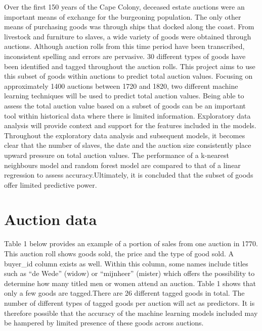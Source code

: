 \documentclass[11pt,preprint, authoryear]{elsarticle}
\numberwithin{equation}{section}
\numberwithin{figure}{section}
\numberwithin{table}{section}
\begin{document}
Over the first 150 years of the Cape Colony, deceased estate auctions
were an important means of exchange for the burgeoning population. The
only other means of purchasing goods was through ships that docked along
the coast. From livestock and furniture to slaves, a wide variety of
goods were obtained through auctions. Although auction rolls from this
time period have been transcribed, inconsistent spelling and errors are
pervasive. 30 different types of goods have been identified and tagged
throughout the auction rolls. This project aims to use this subset of
goods within auctions to predict total auction values. Focusing on
approximately 1400 auctions between 1720 and 1820, two different machine
learning techniques will be used to predict total auction values. Being
able to assess the total auction value based on a subset of goods can be
an important tool within historical data where there is limited
information. Exploratory data analysis will provide context and support
for the features included in the models. Throughout the exploratory data
analysis and subsequent models, it becomes clear that the number of
slaves, the date and the auction size consistently place upward pressure
on total auction values. The performance of a k-nearest neighbours model
and random forest model are compared to that of a linear regression to
assess accuracy.Ultimately, it is concluded that the subset of goods
offer limited predictive power.

\newpage

\hypertarget{auction-data}{%
\section{Auction data}\label{auction-data}}

Table 1 below provides an example of a portion of sales from one auction
in 1770. This auction roll shows goods sold, the price and the type of
good sold. A buyer\_id column exists as well. Within this column, some
names include titles such as ``de Wede'' (widow) or ``mijnheer''
(mister) which offers the possibility to determine how many titled men
or women attend an auction. Table 1 shows that only a few goods are
tagged.There are 26 different tagged goods in total. The number of
different types of tagged goods per auction will act as predictors. It
is therefore possible that the accuracy of the machine learning models
included may be hampered by limited presence of these goods across
auctions.

 
  \providecommand{\huxb}[2]{\arrayrulecolor[RGB]{#1}\global\arrayrulewidth=#2pt}
  \providecommand{\huxvb}[2]{\color[RGB]{#1}\vrule width #2pt}
  \providecommand{\huxtpad}[1]{\rule{0pt}{#1}}
  \providecommand{\huxbpad}[1]{\rule[-#1]{0pt}{#1}}
\end{document}

